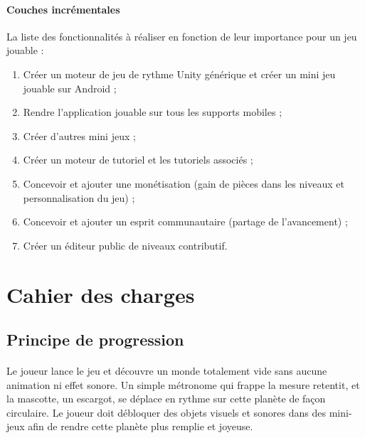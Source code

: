 \paragraph{Couches incrémentales}
La liste des fonctionnalités à réaliser en fonction de leur importance pour un jeu jouable :
\begin{enumerate}
\item Créer un moteur de jeu de rythme Unity générique et créer un mini jeu jouable sur Android ;
\item Rendre l’application jouable sur tous les supports mobiles ;
\item Créer d’autres mini jeux ;
\item Créer un moteur de tutoriel et les tutoriels associés ;
\item Concevoir et ajouter une monétisation (gain de pièces dans les niveaux et personnalisation du jeu) ;
\item Concevoir et ajouter un esprit communautaire (partage de l’avancement) ;
\item Créer un éditeur public de niveaux contributif.
\end{enumerate}


\section{Cahier des charges}

\subsection{Principe de progression}
\paragraph{} Le joueur lance le jeu et découvre un monde totalement vide sans aucune animation ni effet sonore. Un simple métronome qui frappe la mesure retentit, et la mascotte, un escargot, se déplace en rythme sur cette planète de façon circulaire.
Le joueur doit débloquer des objets visuels et sonores dans des mini-jeux afin de rendre cette planète plus remplie et joyeuse.


